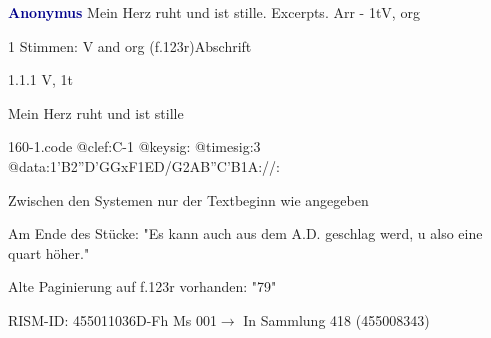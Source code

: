 \documentclass[twocolumn]{book}
\begin{document}
\par \vspace{7pt} \textcolor{darkblue}{\textbf{Anonymus  }}\hfillplus{\textbf{[160]}}\newline Mein Herz ruht und ist stille. Excerpts. Arr - 1t\newline V, org
\par \begin{itshape}\end{itshape} 
\par \textcolor{darkblue}{}  1 Stimmen: V and org  (f.123r)\newline Abschrift
\par 1.1.1  V, 1t\newline \begin{footnotesize} Mein Herz ruht und ist stille \end{footnotesize}  
\begin{filecontents*}{160-1.code}
@clef:C-1
@keysig:
@timesig:3
@data:1'B2''D'GGxF1ED/G2AB''C'B1A://:
\end{filecontents*}
\newline
%
\par Zwischen den Systemen nur der Textbeginn wie angegeben
\par Am Ende des Stücke: "Es kann auch aus dem A.D. geschlag werd, u also eine quart höher."
\par Alte Paginierung auf f.123r vorhanden: "79"
\par RISM-ID: 455011036\newline D-Fh  Ms 001\newline $\rightarrow$ In Sammlung 418 (455008343)
      
\end{document}
